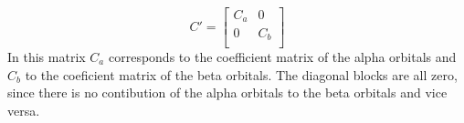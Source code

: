 \begin{equation}\label{eq:coefs}
    C' = \begin{bmatrix}
        C_a & 0 \\
        0 & C_b \\
    \end{bmatrix}
\end{equation} 
In this matrix $C_a$ corresponds to the coefficient matrix of the alpha orbitals and $C_b$ to the coeficient matrix of the beta orbitals. The diagonal blocks are all zero, since there is no contibution of the alpha orbitals to the beta orbitals and vice versa.
